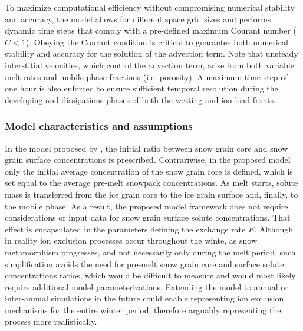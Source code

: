 \documentclass[authoryear,preprint,review,12pt]{elsarticle}
\begin{document}
To maximize computational efficiency without compromising numerical stability and accuracy, the model allows for different space grid sizes and performs dynamic time steps that comply with a pre-defined maximum Courant number ($C < 1$). Obeying the Courant condition is critical to guarantee both numerical stability and accuracy for the solution of the advection term. Note that unsteady interstitial velocities, which control the advection term, arise from both variable melt rates and mobile phase fractions (i.e. porosity). A maximum time step of one hour is also enforced to ensure sufficient temporal resolution during the developing and dissipations phases of both the wetting and ion load fronts.


\subsubsection{Model characteristics and assumptions}

In the model proposed by \citet{Harrington1998}, the initial ratio between snow grain core and snow grain surface concentrations is prescribed. Contrariwise, in the proposed model only the initial average concentration of the snow grain core is defined, which is set equal to the average pre-melt snowpack concentrations. As melt starts, solute mass is transferred from the ice grain core to the ice grain surface and, finally, to the mobile phase. As a result, the proposed model framework does not require considerations or input data for snow grain surface solute concentrations. That effect is encapsulated in the parameters defining the exchange rate $E$. Although in reality ion exclusion processes occur throughout the winte, as snow metamorphism progresses, and not necessarily only during the melt period, such simplification avoids the need for pre-melt snow grain core and surface solute concentrations ratios, which would be difficult to measure and would most likely require additional model parameterizations. Extending the model to annual or inter-annual simulations in the future could enable representing ion exclusion mechanisms for the entire winter period, therefore arguably representing the process more realistically. \par
\end{document}
